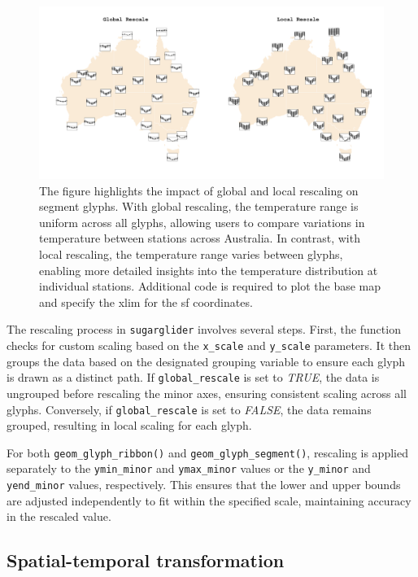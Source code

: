 \begin{figure}

{\centering \includegraphics[width=1\linewidth]{figures/global_rescale} 

}

\caption{The figure highlights the impact of global and local rescaling on segment glyphs. With global rescaling, the temperature range is uniform across all glyphs, allowing users to compare variations in temperature between stations across Australia. In contrast, with local rescaling, the temperature range varies between glyphs, enabling more detailed insights into the temperature distribution at individual stations. Additional code is required to plot the base map and specify the xlim for the sf coordinates.}\label{fig:unnamed-chunk-6}
\end{figure}

The rescaling process in \texttt{sugarglider} involves several steps. First, the function checks for custom scaling based on the \texttt{x\_scale} and \texttt{y\_scale} parameters. It then groups the data based on the designated grouping variable to ensure each glyph is drawn as a distinct path. If \texttt{global\_rescale} is set to \emph{TRUE}, the data is ungrouped before rescaling the minor axes, ensuring consistent scaling across all glyphs. Conversely, if \texttt{global\_rescale} is set to \emph{FALSE}, the data remains grouped, resulting in local scaling for each glyph.

For both \texttt{geom\_glyph\_ribbon()} and \texttt{geom\_glyph\_segment()}, rescaling is applied separately to the \texttt{ymin\_minor} and \texttt{ymax\_minor} values or the \texttt{y\_minor} and \texttt{yend\_minor} values, respectively. This ensures that the lower and upper bounds are adjusted independently to fit within the specified scale, maintaining accuracy in the rescaled value.

\hypertarget{spatial-temporal-transformation}{%
\subsection{Spatial-temporal transformation}\label{spatial-temporal-transformation}}


